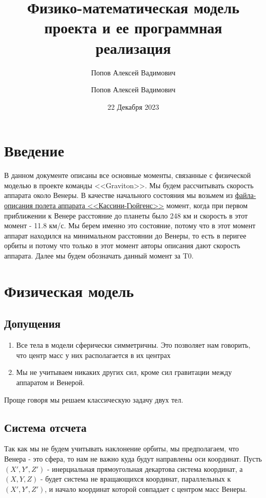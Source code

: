 \documentclass{article}
\title{Физико-математическая модель проекта и ее программная реализация}
\author{Попов Алексей Вадимович}
\author{Попов Алексей Вадимович}
\date{22 Декабря 2023}
\begin{document}
    \maketitle
    \section{Введение}
    В данном документе описаны все основные моменты, связанные с физической моделью в проекте команды <<Graviton>>. Мы будем рассчитывать скорость аппарата около Венеры. В качестве начального состояния мы возьмем из \href{https://pds-atmospheres.nmsu.edu/data_and_services/atmospheres_data/Cassini_PDS3/mission-cat_3-26-13}{файла-описания полета аппарата <<Кассини-Гюйгенс>>} момент, когда при первом приближении к Венере расстояние до планеты было 248 км и скорость в этот момент - 11.8 км/с. Мы берем именно это состояние, потому что в этот момент аппарат находился на минимальном расстоянии до Венеры, то есть в перигее орбиты и потому что только в этот момент авторы описания дают скорость аппарата. Далее мы будем обозначать данный момент за T0.
    \section{Физическая модель}
    \subsection{Допущения}
    \begin{enumerate}
        \item Все тела в модели сферически симметричны. Это позволяет нам говорить, что центр масс у них располагается в их центрах
        \item Мы не учитываем никаких других сил, кроме сил гравитации между аппаратом и Венерой.
    \end{enumerate}
    Проще говоря мы решаем классическую задачу двух тел.
    \subsection{Система отсчета}
    Так как мы не будем учитывать наклонение орбиты, мы предполагаем, что Венера - это сфера, то нам не важно куда будут направлены оси координат. Пусть $(X', Y', Z')$ - инерциальная прямоугольная декартова система координат, а $(X, Y, Z)$ - будет система не вращающихся координат, параллельных к $(X', Y', Z')$, и начало координат которой совпадает с центром масс Венеры.
\end{document}

